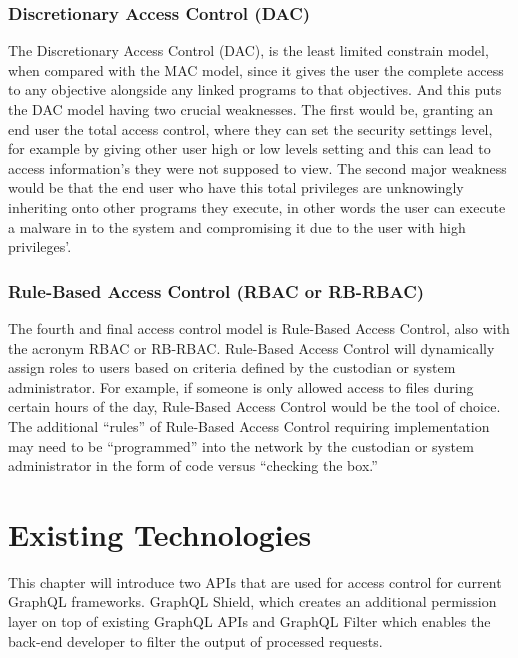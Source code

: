 \documentclass[conference]{IEEEtran}
\begin{document}
\subsubsection{Discretionary Access Control (DAC)}\label{(DAC)}
\newline
The Discretionary Access Control (DAC), is the least limited constrain model, when compared with the MAC model, since it gives the user the complete access to any objective alongside any linked programs to that objectives. And this puts the DAC model having two crucial weaknesses. The first would be, granting an end user the total access control, where they can set the security settings level, for example by giving other user high or low levels setting and this can lead to access information’s they were not supposed to view. The second major weakness would be that the end user who have this total privileges are unknowingly inheriting onto other programs they execute, in other words the user can execute a malware in to the system and compromising it due to the user with high privileges’.
\newline
\subsubsection{Rule-Based Access Control (RBAC or RB-RBAC)}\label{(RBAC)}
\newline
The fourth and final access control model is Rule-Based Access Control, also with the acronym RBAC or RB-RBAC. Rule-Based Access Control will dynamically assign roles to users based on criteria defined by the custodian or system administrator. For example, if someone is only allowed access to files during certain hours of the day, Rule-Based Access Control would be the tool of choice. The additional “rules” of Rule-Based Access Control requiring implementation may need to be “programmed” into the network by the custodian or system administrator in the form of code versus “checking the box.”

\section{Existing Technologies}\label{ex_tech}

This chapter will introduce two APIs that are used for access control for current GraphQL frameworks. GraphQL Shield, which creates an additional permission layer on top of existing GraphQL APIs and GraphQL Filter which enables the back-end developer to filter the output of processed requests.
\end{document}
